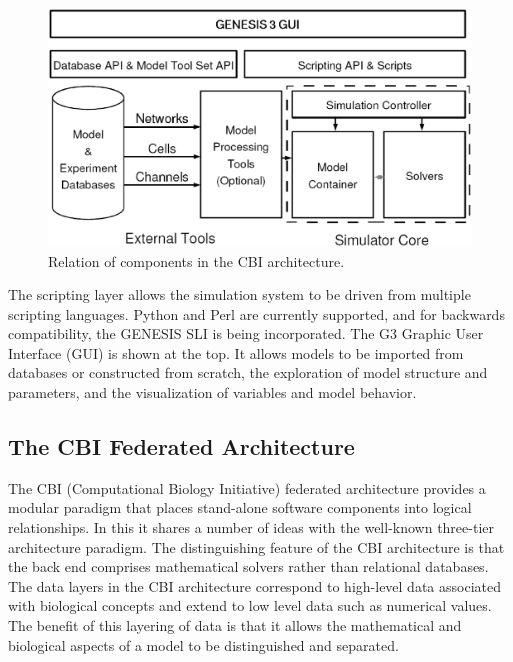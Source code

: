 \documentclass[12pt]{article}
\begin{document}
\begin{figure}[ht]
  \centering
    \includegraphics[scale=0.4]{figures/G3arch.eps}
  \caption{Relation of components in the CBI architecture.}
  \label{fig:cbi-arch}
\end{figure}

The scripting layer allows the simulation system to be driven from
multiple scripting languages. Python and Perl are currently supported,
and for backwards compatibility, the GENESIS SLI is being
incorporated. The G3 Graphic User Interface (GUI) is shown at the top.
It allows models to be imported from databases or constructed from
scratch, the exploration of model structure and parameters, and the
visualization of variables and model behavior.

\subsection{The CBI Federated Architecture}
The CBI (Computational Biology Initiative) federated architecture
provides a modular paradigm that places stand-alone software
components into logical relationships. In this it shares a number of
ideas with the well-known three-tier architecture paradigm.  The
distinguishing feature of the CBI architecture is that the back end
comprises mathematical solvers rather than relational databases.  The
data layers in the CBI architecture correspond to high-level data
associated with biological concepts and extend to low level data such
as numerical values. The benefit of this layering of data is that it
allows the mathematical and biological aspects of a model to be
distinguished and separated.
\end{document}
